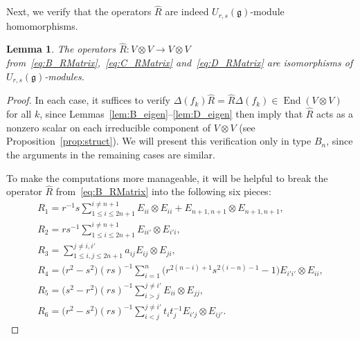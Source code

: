 \documentclass[pdftex]{sigma}
\numberwithin{equation}{section}
\newtheorem{Lemma}[Theorem]{Lemma}
\DeclareMathOperator{\End}{End}
\newcommand{\fg}{\mathfrak{g}}
\newcommand{\uu}{U_{r,s}(\fg)}
\begin{document}
Next, we verify that the operators $\hat{R}$ are indeed $\uu$-module homomorphisms.


\begin{Lemma}\label{lem:B_Intertwining}
The operators $\hat{R}\colon V \otimes V \to V \otimes V$ from~\eqref{eq:B_RMatrix},~\eqref{eq:C_RMatrix} and~\eqref{eq:D_RMatrix} are isomorphisms of $\uu$-modules.
\end{Lemma}


\begin{proof}
In each case, it suffices to verify $\Delta(f_{k})\hat{R} = \hat{R}\Delta(f_{k})\in \End(V \otimes V)$ for all $k$, since Lemmas~\ref{lem:B_eigen}--\ref{lem:D_eigen} then imply that $\hat{R}$ acts as a nonzero scalar on each irreducible component of $V \otimes V$ (see Proposition~\ref{prop:struct}). We will present this verification only in type $B_{n}$, since the arguments in the remaining cases are similar.

To make the computations more manageable, it will be helpful to break the operator $\hat{R}$ from~\eqref{eq:B_RMatrix} into the following six pieces:
\begin{gather*}
 R_{1} = r^{-1}s \sum_{1\leq i\leq 2n+1}^{i \neq n + 1} E_{ii} \otimes E_{ii}
 + E_{n + 1,n + 1} \otimes E_{n + 1,n+1}, \\
 R_{2} = rs^{-1} \sum_{1\leq i\leq 2n+1}^{i \neq n + 1} E_{ii'} \otimes E_{i'i}, \\
 R_{3} = \sum_{1\leq i,j\leq 2n+1}^{j \neq i,i'} a_{ij}E_{ij} \otimes E_{ji}, \\
 R_{4} = \bigl(r^{2} - s^{2}\bigr)(rs)^{-1} \sum_{i = 1}^{n}\bigl(r^{2(n - i) + 1}s^{2(i - n) - 1} - 1\bigr) E_{i'i'} \otimes E_{ii}, \\
 R_{5} = \bigl(s^{2} - r^{2}\bigr)(rs)^{-1} \sum_{i > j}^{j \neq i'} E_{ii} \otimes E_{jj},\\
 R_{6} = \bigl(r^{2} - s^{2}\bigr)(rs)^{-1} \sum_{i < j}^{j \neq i'} t_{i}t_{j}^{-1}E_{i'j} \otimes E_{ij'}.
\end{gather*}



\end{proof}
\end{document}
